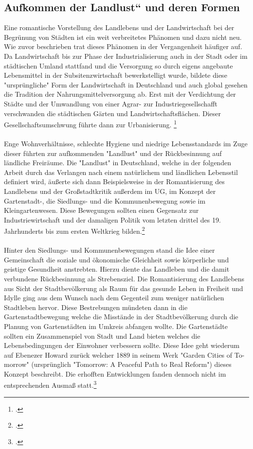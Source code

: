 \documentclass{scrartcl}
\begin{document}
\subsection{Aufkommen der Landlust“ und deren Formen}
Eine romantische Vorstellung des Landlebens und der Landwirtschaft bei der Begrünung von Städten ist ein weit verbreitetes Phänomen und dazu nicht neu. Wie zuvor beschrieben trat dieses Phänomen in der Vergangenheit häufiger auf. Da Landwirtschaft bis zur Phase der Industrialisierung auch in der Stadt oder im städtischen Umland stattfand und die Versorgung so durch eigens angebaute Lebensmittel in der Subsitenzwirtschaft bewerkstelligt wurde, bildete diese "ursprüngliche" Form der Landwirtschaft in Deutschland und auch global gesehen die Tradition der Nahrungsmittelversorgung ab. Erst mit der Verdichtung der Städte und der Umwandlung von einer Agrar- zur Industriegesellschafft verschwanden die städtischen Gärten und Landwirtschaftsflächen. Dieser Gesellschaftsumschwung führte dann zur Urbanisierung. \footcite[Vgl.][S. 32ff]{Egnolff2015DieIdeal}\\
\\
Enge Wohnverhältnisse, schlechte Hygiene und niedrige Lebensstandards im Zuge dieser führten zur aufkommenden "Landlust" und der Rückbesinnung auf ländliche Freiräume. Die "Landlust" in Deutschland, welche in der folgenden Arbeit durch das Verlangen nach einem natürlichem und ländlichen Lebensstil definiert wird, äußerte sich dann Beispielsweise in der Romantisierung des Landlebens und der Großstadtkritik außerdem im UG, im Konzept der Gartenstadt-, die Siedlungs- und die Kommunenbewegung sowie im Kleingartenwesen. Diese Bewegungen sollten einen Gegensatz zur Industriewirtschaft und der damaligen Politik vom letzten drittel des 19. Jahrhunderts bis zum ersten Weltkrieg bilden.\footcite[Vgl.][S. 35]{Egnolff2015DieIdeal}\\
\\
Hinter den Siedlungs- und Kommunenbewegungen stand die Idee einer Gemeinschaft die soziale und ökonomische Gleichheit sowie körperliche und geistige Gesundheit anstrebten. Hierzu diente das Landleben und die damit verbundene Rückbesinnung als Strebensziel. Die Romantisierung des Landlebens aus Sicht der Stadtbevölkerung als Raum für das gesunde Leben in Freiheit und Idylle ging aus dem Wunsch nach dem Gegenteil zum weniger natürlichen Stadtleben hervor. Diese Bestrebungen mündeten dann in die Gartenstadtbewegung welche die Misstände in der Stadtbevölkerung durch die Planung von Gartenstädten im Umkreis abfangen wollte. Die Gartenstädte sollten ein Zusammenspiel von Stadt und Land bieten welches die Lebensbedingungen der Einwohner verbessern sollte. Diese Idee geht wiederum auf Ebenezer Howard zurück welcher 1889 in seinem Werk "Garden Cities of To-morrow" (ursprünglich "Tomorrow: A Peaceful Path to Real Reform") dieses Konzept beschreibt. Die erhofften Entwicklungen fanden dennoch nicht im entsprechenden Ausmaß statt.\footcite[Vgl.][S. 36]{Egnolff2015DieIdeal}
\end{document}
